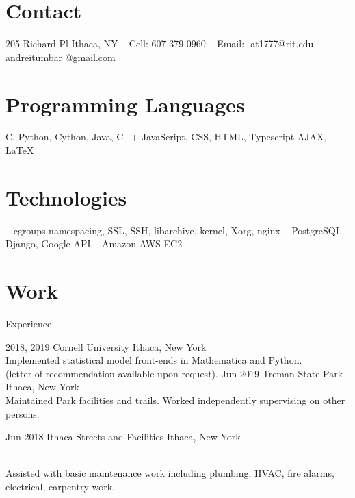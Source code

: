 \documentclass[]{alternate}
\begin{document}


\border{}
\bordersecond{}

\begin{aside}
%
\section{Contact}
205 Richard Pl 
Ithaca, NY
~
Cell:
607-379-0960
~
Email:-
at1777@rit.edu
andreitumbar
@gmail.com
%
%
\section{Programming
   Languages}
C, Python, Cython,
Java, C++ JavaScript,
CSS, HTML, Typescript
AJAX, \LaTeX{}
%
%
\section{Technologies}
 -- cgroups namespacing, SSL, SSH, libarchive, kernel, Xorg, nginx
 -- PostgreSQL
 -- Django, Google API
 -- Amazon AWS EC2
%
\end{aside}



\section{Work}{Experience}

\begin{entrylist}
\entry
  {2018, 2019}
  {Cornell University}
  {Ithaca, New York}
  {\\
  Implemented statistical model front-ends in Mathematica and Python. \\(letter of recommendation available upon request).}
\entry
  {Jun-2019}
  {Treman State Park}
  {Ithaca, New York}
  {\\
Maintained Park facilities and trails. Worked independently supervising on other persons.
  }

\entry
  {Jun-2018}
  {Ithaca Streets and Facilities}
  {Ithaca, New York}
  {\\
Assisted with basic maintenance work including plumbing, HVAC, fire alarms, electrical, carpentry work.

  }


\end{entrylist}
\end{document}
